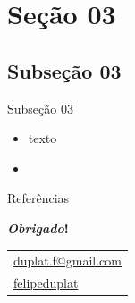 \documentclass[aspectratio=169, 9pt]{beamer}
\begin{document}
\section{Seção 03}

\subsection[]{Subseção 03}

\begin{frame}{Subseção 03}
	\begin{itemize}[<+->]
		\item texto
		\item 
	\end{itemize}
\end{frame}



\begin{frame}{Referências}
\printbibliography
\end{frame}


\begin{frame}
	\begin{center}
			\textbf{\textit{Obrigado}!} \\
			\vspace{0.5cm}
			
			\begin{tabular}{l}
				\faAt \hspace{0.001mm} \href{mailto:duplat.f@gmail.com}{duplat.f@gmail.com} \\
				\faLinkedin \hspace{0.001mm} \href{https://www.linkedin.com/in/felipeduplat/}{felipeduplat}
			\end{tabular}
		\end{center}
\end{frame}
\end{document}
